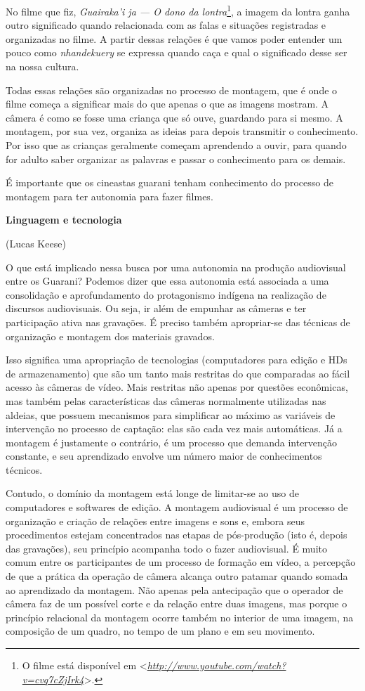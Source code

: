 No filme que fiz, \emph{Guairaka'i ja --- O dono da lontra}\footnote{O
  filme está disponível em
  \textless{}\href{http://www.youtube.com/watch?v=cvq7cZjIrk4}{\emph{http://www.youtube.com/watch?v=cvq7cZjIrk4}}\textgreater{}.},
a imagem da lontra ganha outro significado quando relacionada com as
falas e situações registradas e organizadas no filme. A partir dessas
relações é que vamos poder entender um pouco como \emph{nhandekuery} se
expressa quando caça e qual o significado desse ser na nossa cultura.

Todas essas relações são organizadas no processo de montagem, que é onde
o filme começa a significar mais do que apenas o que as imagens mostram.
A câmera é como se fosse uma criança que só ouve, guardando para si
mesmo. A montagem, por sua vez, organiza as ideias para depois
transmitir o conhecimento. Por isso que as crianças geralmente começam
aprendendo a ouvir, para quando for adulto saber organizar as palavras e
passar o conhecimento para os demais.

É importante que os cineastas guarani tenham conhecimento do processo de
montagem para ter autonomia para fazer filmes.

\textbf{Linguagem e tecnologia}

(Lucas Keese)

O que está implicado nessa busca por uma autonomia na produção
audiovisual entre os Guarani? Podemos dizer que essa autonomia está
associada a uma consolidação e aprofundamento do protagonismo indígena
na realização de discursos audiovisuais. Ou seja, ir além de empunhar as
câmeras e ter participação ativa nas gravações. É preciso também
apropriar-se das técnicas de organização e montagem dos materiais
gravados.

Isso significa uma apropriação de tecnologias (computadores para edição
e HDs de armazenamento) que são um tanto mais restritas do que
comparadas ao fácil acesso às câmeras de vídeo. Mais restritas não
apenas por questões econômicas, mas também pelas características das
câmeras normalmente utilizadas nas aldeias, que possuem mecanismos para
simplificar ao máximo as variáveis de intervenção no processo de
captação: elas são cada vez mais automáticas. Já a montagem é justamente
o contrário, é um processo que demanda intervenção constante, e seu
aprendizado envolve um número maior de conhecimentos técnicos.

Contudo, o domínio da montagem está longe de limitar-se ao uso de
computadores e softwares de edição. A montagem audiovisual é um processo
de organização e criação de relações entre imagens e sons e, embora seus
procedimentos estejam concentrados nas etapas de pós-produção (isto é,
depois das gravações), seu princípio acompanha todo o fazer audiovisual.
É muito comum entre os participantes de um processo de formação em
vídeo, a percepção de que a prática da operação de câmera alcança outro
patamar quando somada ao aprendizado da montagem. Não apenas pela
antecipação que o operador de câmera faz de um possível corte e da
relação entre duas imagens, mas porque o princípio relacional da
montagem ocorre também no interior de uma imagem, na composição de um
quadro, no tempo de um plano e em seu movimento.

